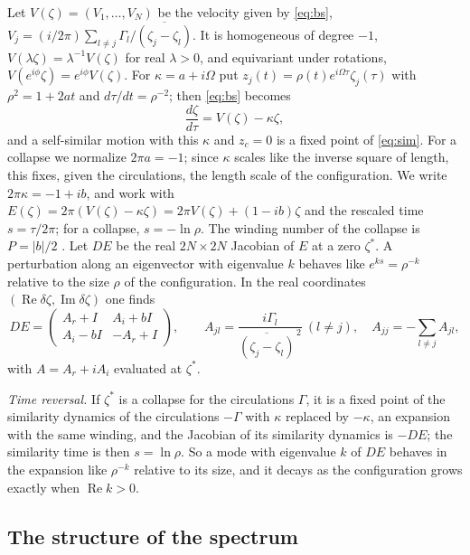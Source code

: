 \documentclass[11pt]{article}
\theoremstyle{definition}
\newcommand{\re}{\operatorname{Re}}
\newcommand{\im}{\operatorname{Im}}
\begin{document}
Let $V(\zeta) = (V_1, \ldots, V_N)$ be the velocity given by \eqref{eq:bs}, $V_j = (i/2\pi)\sum_{l \ne j}\Gamma_l/\overline{(\zeta_j - \zeta_l)}$. It is homogeneous of degree $-1$, $V(\lambda\zeta) = \lambda^{-1}V(\zeta)$ for real $\lambda > 0$, and equivariant under rotations, $V(e^{i\phi}\zeta) = e^{i\phi}V(\zeta)$. For $\kappa = a + i\Omega$ put $z_j(t) = \rho(t)e^{i\Omega\tau}\zeta_j(\tau)$ with $\rho^2 = 1 + 2at$ and $d\tau/dt = \rho^{-2}$; then \eqref{eq:bs} becomes
\begin{equation}\label{eq:sim}
  \frac{d\zeta}{d\tau} = V(\zeta) - \kappa\zeta ,
\end{equation}
and a self-similar motion with this $\kappa$ and $z_c = 0$ is a fixed point of \eqref{eq:sim}. For a collapse we normalize $2\pi a = -1$; since $\kappa$ scales like the inverse square of length, this fixes, given the circulations, the length scale of the configuration. We write $2\pi\kappa = -1 + ib$, and work with $E(\zeta) = 2\pi(V(\zeta) - \kappa\zeta) = 2\pi V(\zeta) + (1 - ib)\zeta$ and the rescaled time $s = \tau/2\pi$; for a collapse, $s = -\ln\rho$. The winding number of the collapse is $P = |b|/2$ \cite{mw2026}. Let $DE$ be the real $2N \times 2N$ Jacobian of $E$ at a zero $\zeta^*$. A perturbation along an eigenvector with eigenvalue $k$ behaves like $e^{ks} = \rho^{-k}$ relative to the size $\rho$ of the configuration. In the real coordinates $(\re\delta\zeta, \im\delta\zeta)$ one finds
\begin{equation}\label{eq:DE}
  DE = \begin{pmatrix} A_r + I & A_i + bI\\ A_i - bI & -A_r + I\end{pmatrix},\qquad A_{jl} = \frac{i\Gamma_l}{\overline{(\zeta_j - \zeta_l)}^{\,2}}\ (l \ne j),\quad A_{jj} = -\sum_{l \ne j}A_{jl},
\end{equation}
with $A = A_r + iA_i$ evaluated at $\zeta^*$.

\emph{Time reversal.} If $\zeta^*$ is a collapse for the circulations $\Gamma$, it is a fixed point of the similarity dynamics of the circulations $-\Gamma$ with $\kappa$ replaced by $-\kappa$, an expansion with the same winding, and the Jacobian of its similarity dynamics is $-DE$; the similarity time is then $s = \ln\rho$. So a mode with eigenvalue $k$ of $DE$ behaves in the expansion like $\rho^{-k}$ relative to its size, and it decays as the configuration grows exactly when $\re k > 0$.

\subsection{The structure of the spectrum}
\end{document}
